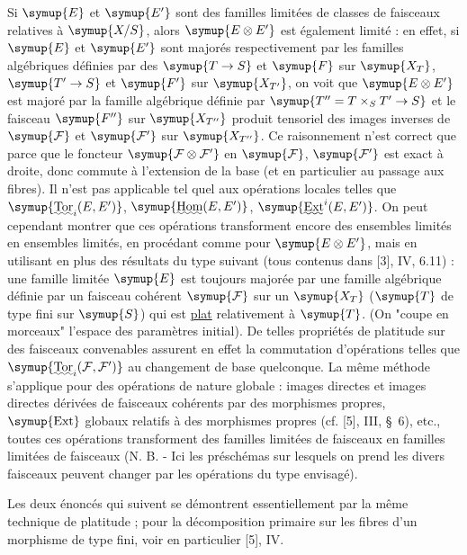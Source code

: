Si $\symup{E}$ et $\symup{E'}$ sont des familles limitées de classes de faisceaux relatives à
$\symup{X/S}$, alors $\symup{E\otimes E'}$ est également limité : en effet, si $\symup{E}$ et $\symup{E'}$ sont
majorés respectivement par les familles algébriques définies par des
$\symup{T\to S}$ et $\symup{F}$ sur $\symup{X_T}$, $\symup{T'\to S}$ et
$\symup{F'}$ sur $\symup{X_{T'}}$, on voit que $\symup{E\otimes E'}$ est majoré par la famille
algébrique définie par $\symup{T''=T\times_S T'\to S}$ et le faisceau
$\symup{F''}$ sur $\symup{X_{T''}}$ produit tensoriel des images inverses de
$\symup{\mathcal F}$ et $\symup{\mathcal F'}$ sur $\symup{X_{T''}}$. Ce raisonnement n'est correct que
parce que le foncteur $\symup{\mathcal F\otimes\mathcal F'}$ en $\symup{\mathcal F}$,
$\symup{\mathcal F'}$ est exact à droite, donc commute à l'extension de la base (et en
particulier au passage aux fibres). Il n'est pas applicable tel quel aux
opérations locales telles que $\symup{\mathop{\text{\uwave{Tor}}}\nolimits_i(E,E')}$,
$\symup{\mathop{\text{\uwave{Hom}}}\nolimits(E,E')}$, $\symup{\mathop{\text{\uwave{Ext}}}\nolimits^i(E,E')}$. On peut cependant
montrer que ces opérations transforment encore des ensembles limités en ensembles
limités, en procédant comme pour $\symup{E\otimes E'}$, mais en utilisant en plus des
résultats du type suivant (tous contenus dans [3], IV, 6.11) : une famille
limitée $\symup{E}$ est toujours majorée par une famille algébrique définie par un
faisceau cohérent $\symup{\mathcal F}$ sur un $\symup{X_T}$ ($\symup{T}$ de type fini sur $\symup{S}$) qui est
\uline{plat} relativement à $\symup{T}$. (On "coupe en morceaux" l'espace des paramètres
initial). De telles
propriétés de platitude sur des faisceaux convenables assurent en effet la
commutation d'opérations telles que $\symup{\mathop{\text{\uwave{Tor}}}\nolimits_i(\mathcal F,\mathcal
F')}$ au changement de base quelconque. La même méthode s'applique pour des
opérations de nature globale : images directes et images directes dérivées de
faisceaux cohérents par des morphismes propres, $\symup{\operatorname{Ext}}$ globaux
relatifs à des morphismes propres (cf. [5], III, \S~6), etc., toutes ces
opérations transforment des familles limitées de faisceaux en familles limitées
de faisceaux (N. B. - Ici les préschémas sur lesquels on prend les divers
faisceaux peuvent changer par les opérations du type envisagé).

Les deux énoncés qui suivent se démontrent essentiellement par la même
technique de platitude ; pour la décomposition primaire sur les fibres d'un
morphisme de type fini, voir en particulier [5], IV.

